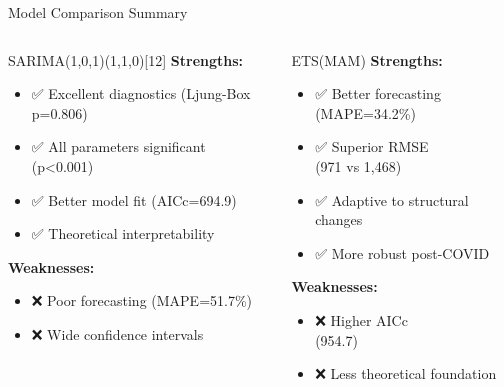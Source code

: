 \documentclass[10pt]{beamer}
\begin{document}
\begin{frame}{Model Comparison Summary}
\begin{columns}
\begin{column}{0.45\textwidth}
\begin{block}{SARIMA(1,0,1)(1,1,0)[12]}
\textbf{Strengths:}
\begin{itemize}
\item ✅ Excellent diagnostics (Ljung-Box p=0.806)
\item ✅ All parameters significant (p<0.001)
\item ✅ Better model fit (AICc=694.9)
\item ✅ Theoretical interpretability
\end{itemize}

\textbf{Weaknesses:}
\begin{itemize}
\item ❌ Poor forecasting (MAPE=51.7\%)
\item ❌ Wide confidence intervals
\end{itemize}
\end{block}
\end{column}

\begin{column}{0.45\textwidth}
\begin{block}{ETS(MAM)}
\textbf{Strengths:}
\begin{itemize}
\item ✅ Better forecasting (MAPE=34.2\%)
\item ✅ Superior RMSE \\ (971 vs 1,468)
\item ✅ Adaptive to structural changes
\item ✅ More robust post-COVID
\end{itemize}

\textbf{Weaknesses:}
\begin{itemize}
\item ❌ Higher AICc \\(954.7)
\item ❌ Less theoretical foundation
\end{itemize}
\end{block}
\end{column}
\end{columns}


\end{frame}
\end{document}
